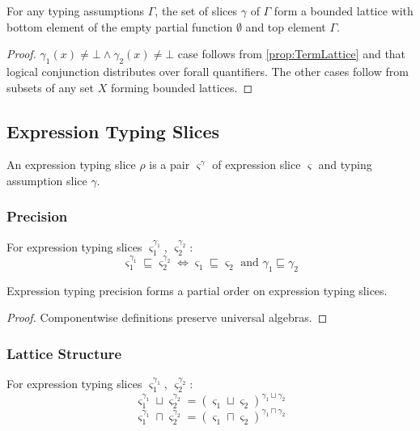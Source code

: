 \begin{proposition}
For any typing assumptions $\Gamma$, the set of slices $\gamma$ of $\Gamma$ form a bounded lattice with bottom element of the empty partial function $\emptyset$ and top element $\Gamma$.
\end{proposition}
\begin{proof}
$\gamma_1(x) \neq \bot \land \gamma_2(x) \neq \bot$ case follows from \cref{prop:TermLattice} and that logical conjunction distributes over forall quantifiers. The other cases follow from subsets of any set $X$ forming bounded lattices.
\end{proof}
\subsection{Expression Typing Slices}
\begin{definition}
An expression typing slice $\rho$ is a pair $\varsigma^\gamma$ of expression slice $\varsigma$ and typing assumption slice $\gamma$.
\end{definition}

\subsubsection{Precision}
\begin{definition}
For expression typing slices $\varsigma_1^{\gamma_1}$, $\varsigma_2^{\gamma_2}$:
\[\varsigma_1^{\gamma_1} \sqsubseteq \varsigma_2^{\gamma_2} \iff  \varsigma_1 \sqsubseteq \varsigma_2 \text{ and } \gamma_1 \sqsubseteq \gamma_2\]
\end{definition}
\begin{proposition}
Expression typing precision forms a partial order on expression typing slices.
\end{proposition}
\begin{proof}
Componentwise definitions preserve universal algebras.
\end{proof}
\subsubsection{Lattice Structure}

\begin{definition}
For expression typing slices $\varsigma_1^{\gamma_1}$, $\varsigma_2^{\gamma_2}$:
\[\varsigma_1^{\gamma_1} \sqcup \varsigma_2^{\gamma_2} = (\varsigma_1 \sqcup \varsigma_2)^{\gamma_1 \sqcup \gamma_2}\]
\[\varsigma_1^{\gamma_1} \sqcap \varsigma_2^{\gamma_2} = (\varsigma_1 \sqcap \varsigma_2)^{\gamma_1 \sqcap \gamma_2}\]
\end{definition}

